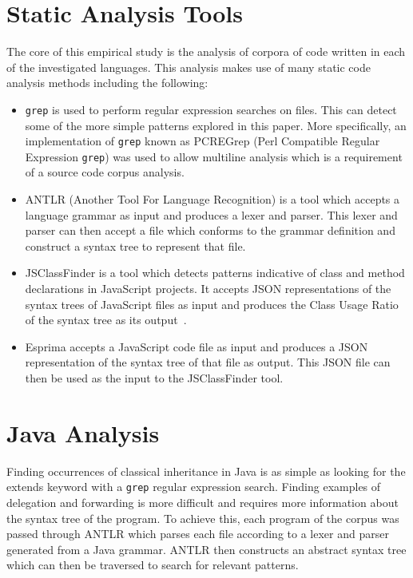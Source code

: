 \section{Static Analysis Tools}
The core of this empirical study is the analysis of corpora of code written in each of the investigated languages. This analysis makes use of many static code analysis methods including the following:
\begin{itemize}
	\item \texttt{grep} is used to perform regular expression searches on files. This can detect some of the more simple patterns explored in this paper. More specifically, an implementation of \texttt{grep} known as PCREGrep (Perl Compatible Regular Expression \texttt{grep}) was used to allow multiline analysis which is a requirement of a source code corpus analysis.
	\item ANTLR (Another Tool For Language Recognition) is a tool which accepts a language grammar as input and produces a lexer and parser. This lexer and parser can then accept a file which conforms to the grammar definition and construct a syntax tree to represent that file.
	\item JSClassFinder is a tool which detects patterns indicative of class and method declarations in JavaScript projects. It accepts JSON representations of the syntax trees of JavaScript files as input and produces the Class Usage Ratio of the syntax tree as its output~\cite{JSClassFinder}.
	\item Esprima accepts a JavaScript code file as input and produces a JSON representation of the syntax tree of that file as output. This JSON file can then be used as the input to the JSClassFinder tool.
\end{itemize}

\section{Java Analysis}
Finding occurrences of classical inheritance in Java is as simple as looking for the extends keyword with a \texttt{grep} regular expression search. Finding examples of delegation and forwarding is more difficult and requires more information about the syntax tree of the program. To achieve this, each program of the corpus was passed through ANTLR which parses each file according to a lexer and parser generated from a Java grammar. ANTLR then constructs an abstract syntax tree which can then be traversed to search for relevant patterns.
\newline

